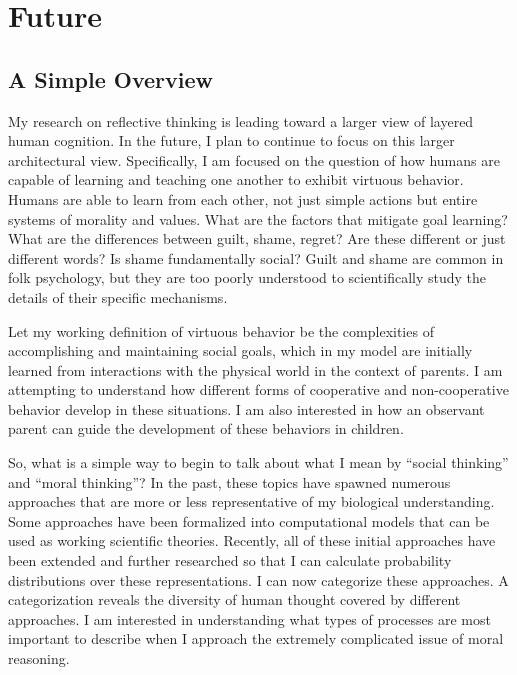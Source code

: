 \chapter{Future}\label{ch:future}

\section{A Simple Overview}

My research on reflective thinking is leading toward a larger view of
layered human cognition.  In the future, I plan to continue to focus
on this larger architectural view.  Specifically, I am focused on the
question of how humans are capable of learning and teaching one
another to exhibit virtuous behavior.  Humans are able to learn from
each other, not just simple actions but entire systems of morality and
values. What are the factors that mitigate goal learning? What are the
differences between guilt, shame, regret?  Are these different or just
different words? Is shame fundamentally social? Guilt and shame are
common in folk psychology, but they are too poorly understood to
scientifically study the details of their specific mechanisms.

Let my working definition of virtuous behavior be the complexities of
accomplishing and maintaining social goals, which in my model are
initially learned from interactions with the physical world in the
context of parents. I am attempting to understand how different
forms of cooperative and non-cooperative behavior develop in these
situations. I am also interested in how an observant parent can
guide the development of these behaviors in children.

So, what is a simple way to begin to talk about what I mean by
``social thinking'' and ``moral thinking''? In the past, these topics
have spawned numerous approaches that are more or less representative
of my biological understanding. Some approaches have been formalized
into computational models that can be used as working scientific
theories. Recently, all of these initial approaches have been extended
and further researched so that I can calculate probability
distributions over these representations. I can now categorize these
approaches. A categorization reveals the diversity of human thought
covered by different approaches. I am interested in understanding what
types of processes are most important to describe when I approach the
extremely complicated issue of moral reasoning.

